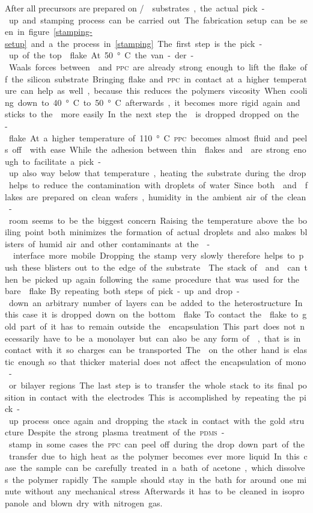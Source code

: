After all precursors are prepared on \si/\sio substrates, the actual pick-up and stamping process can be carried out. The fabrication setup can be seen in figure \ref{stamping-setup} and a the process in \ref{stamping}. The first step is the pick-up of the top \hbng flake. At 50°C the van-der-Waals forces between \hbng and \textsc{ppc} are already strong enough to lift the flake off the silicon substrate. Bringing flake and \textsc{ppc} in contact at a higher temperature can help as well, because this reduces the polymers viscosity. When cooling down to 40°C to 50°C afterwards, it becomes more rigid again and sticks to the \hbng more easily. In the next step the \hbng is dropped dropped on the \tmd-flake. At a higher temperature of 110°C \textsc{ppc} becomes almost fluid and peels off \hbng with ease. While the adhesion between thin \tmdg flakes and \hbng are strong enough to facilitate a pick-up also way below that temperature, heating the substrate during the drop helps to reduce the contamination with droplets of water. Since both \tmdg and \hbng flakes are prepared on clean wafers, humidity in the ambient air of the clean-room seems to be the biggest concern. Raising the temperature above the boiling point both minimizes the formation of actual droplets and also makes blisters of humid air and other contaminants at the \hbn-\tmdg interface more mobile. Dropping the stamp very slowly therefore helps to push these blisters out to the edge of the substrate\cite{pizzocchero_hot_2016}. The stack of \tmdg and \hbng can then be picked up again following the same procedure that was used for the bare \hbng flake. By repeating both steps of pick-up and drop-down an arbitrary number of layers can be added to the heterostructure. In this case it is dropped down on the bottom \hbng flake. To contact the \tmdg flake to gold part of it has to remain outside the \hbng encapsulation. This part does not necessarily have to be a monolayer but can also be any form of \tmdg, that is in contact with it so charges can be transported. The \hbng on the other hand is elastic enough so that thicker material does not affect the encapsulation of mono- or bilayer regions.

The last step is to transfer the whole stack to its final position in contact with the electrodes. This is accomplished by repeating the pick-up process once again and dropping the stack in contact with the gold structure.

Despite the strong plasma treatment of the \textsc{pdms}-stamp in some cases the \textsc{ppc} can peel off during the drop down part of the transfer due to high heat as the polymer becomes ever more liquid. In this case the sample can be carefully treated in a bath of acetone, which dissolves the polymer rapidly. The sample should stay in the bath for around one minute without any mechanical stress. Afterwards it has to be cleaned in isopropanole and blown dry with nitrogen gas. 


